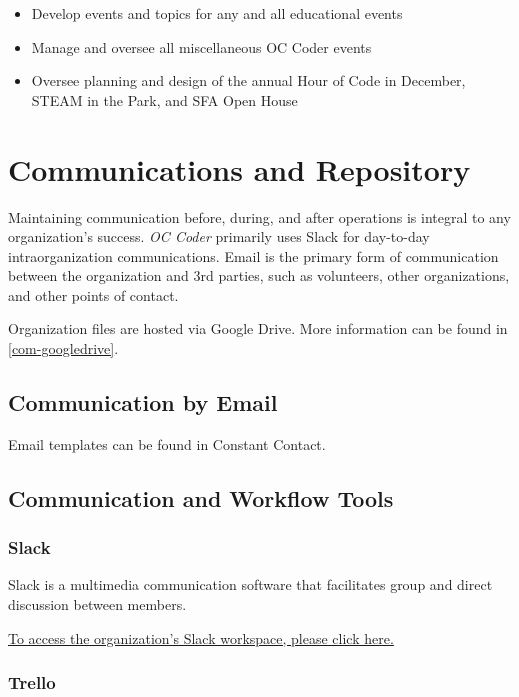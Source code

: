 \documentclass[twoside,11pt,letterpaper,abstracton]{scrartcl}
\begin{document}
\begin{itemize}
    \item Develop events and topics for any and all educational events
    \item Manage and oversee all miscellaneous OC Coder events
    \item Oversee planning and design of the annual Hour of Code in December, STEAM in the Park, and SFA Open House
\end{itemize}

\newpage

\section{Communications and Repository}

Maintaining communication before, during, and after operations is integral to any organization's success. \emph{OC Coder} primarily uses Slack for day-to-day intraorganization communications. Email is the primary form of communication between the organization and 3rd parties, such as volunteers, other organizations, and other points of contact. 

Organization files are hosted via Google Drive. More information can be found in \cref{com-googledrive}.

\subsection{Communication by Email}

Email templates can be found in Constant Contact.

\subsection{Communication and Workflow Tools}

\subsubsection{Slack}

Slack is a multimedia communication software that facilitates group and direct discussion between members. 

\begin{resource}
    \href{}{To access the organization's Slack workspace, please click here.}
\end{resource}

\subsubsection{Trello}
\end{document}
